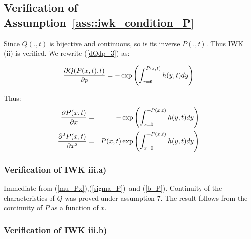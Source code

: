 \documentclass{article}
\begin{document}

\subsection{Verification of Assumption~\protect\ref{ass::iwk_condition_P}}

Since $Q(.,t)$ is bijective and continuous, so is its inverse $P(.,t)$. Thus
IWK (ii) is verified. We rewrite (\ref{dQdp_3}) as:

\begin{equation*}
\frac{\partial Q(P(x,t),t)}{\partial p}=-\exp \left( {%
\int_{x=0}^{P(x,t)}h(y,t)dy}\right)
\end{equation*}

Thus:%
\begin{eqnarray}
\frac{\partial P(x,t)}{\partial x} &=&-\exp \left( {%
\int_{x=0}^{-P(x,t)}h(y,t)dy}\right)  \label{dPdx} \\
\frac{\partial ^{2}P(x,t)}{\partial x^{2}} &=&P(x,t)\exp \left( {%
\int_{x=0}^{-P(x,t)}h(y,t)dy}\right)  \label{dPdx_square}
\end{eqnarray}

\subsubsection{Verification of IWK iii.a)}

Immediate from (\ref{mu_Px}),(\ref{sigma_P})\ and (\ref{b_P}). Continuity of
the characteristics of $Q$ was proved under assumption 7. The result follows
from the continuity of $P$ as a function of $x$.

\bigskip

\subsubsection{Verification of IWK iii.b)}
\end{document}
